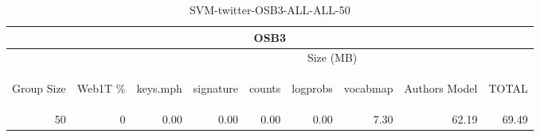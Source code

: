 \begin{center}
\begin{table}[htbp] 
 \begin{center}
\begin{tabular}{ | r | r | r | r | r | r | r | r | r |}
\hline
\multicolumn{9}{|c|}{OSB3}\\
\hline
 & & \multicolumn{7}{|c|}{Size (MB)}\\ \cline{3-9}
\begin{sideways}Group Size\end{sideways} & \begin{sideways}Web1T \% \end{sideways} & \begin{sideways}keys.mph\end{sideways} & \begin{sideways}signature\end{sideways} & \begin{sideways}counts\end{sideways} & \begin{sideways}logprobs\end{sideways} & \begin{sideways}vocabmap\end{sideways} & \begin{sideways}Authors Model \end{sideways} & \begin{sideways}TOTAL\end{sideways}\\
\hline
\multirow{0}{*}{50}
 & 0 & 0.00 & 0.00 & 0.00 & 0.00 & 7.30 & 62.19 & 69.49\\ \cline{2-9}
\hline
\end{tabular}
\caption{SVM-twitter-OSB3-ALL-ALL-50}
\label{table:SVM-twitter-OSB3-ALL-ALL-50}
\end{center}
 \end{table}
\end{center}

